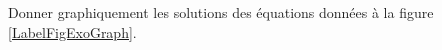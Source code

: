 
\begin{exercice}\label{exoSeconde-0071}


    Donner graphiquement les solutions des équations données à la figure \ref{LabelFigExoGraph}.
    \newcommand{\CaptionFigExoGraph}{Des inéquations à résoudre pour l'exercice \ref{exoSeconde-0071}.}


\end{exercice}
